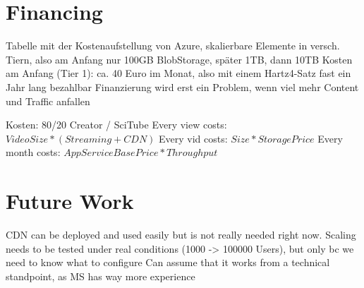 \documentclass[english]{lni}
\begin{document}
\section{Financing}
Tabelle mit der Kostenaufstellung von Azure, skalierbare Elemente
in versch. Tiern, also am Anfang nur 100GB BlobStorage, später 1TB, dann 10TB
Kosten am Anfang (Tier 1): ca. 40 Euro im Monat, also mit einem Hartz4-Satz fast ein Jahr lang bezahlbar
Finanzierung wird erst ein Problem, wenn viel mehr Content und Traffic anfallen

Kosten: 80/20 Creator / SciTube
Every view costs: $VideoSize * (Streaming+CDN)$
Every vid costs: $Size * StoragePrice$
Every month costs: $AppServiceBasePrice * Throughput$

\section{Future Work}
CDN can be deployed and used easily but is not really needed right now. 
Scaling needs to be tested under real conditions (1000 -> 100000 Users), but only bc we need to know what to configure
Can assume that it works from a technical standpoint, as MS has way more experience
    
\newpage
\appendix




\end{document}
